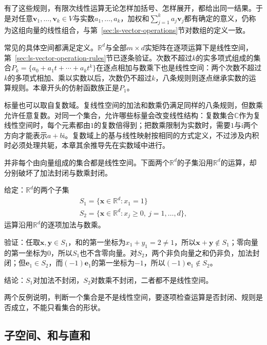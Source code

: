 有了这些规则，有限次线性运算无论怎样加括号、怎样展开，都给出同一结果。于是对任意$\bm v_1,\ldots,\bm v_k\in V$与实数$a_1,\ldots,a_k$，加权和$\sum_{j=1}^ka_j\bm v_j$都有确定的意义，仍称为这组向量的线性组合，与第~\ref{sec:ls-vector-operations}节对数组的定义一致。

常见的具体空间都满足定义。$\mathbb R^d$与全部$m\times d$实矩阵在逐项运算下是线性空间，第~\ref{sec:ls-vector-operation-rules}节已逐条验证。次数不超过$k$的实多项式组成的集合$P_k=\{a_0+a_1t+\cdots+a_kt^k\}$在逐点相加与数乘下也是线性空间：两个次数不超过$k$的多项式相加、乘以实数以后，次数仍不超过$k$，八条规则则逐点继承实数的运算规则。本章开头的仿射函数族正是$P_1$。

标量也可以取自复数域。复线性空间的加法和数乘仍满足同样的八条规则，但数乘允许任意复数。对同一个集合，允许哪些标量会改变线性结构：复数集合$\mathbb C$作为复线性空间时，每个元素都由$1$的复数倍得到；把数乘限制为实数时，需要$1$与$\mathrm i$两个方向才能表示$a+b\mathrm i$。复数域上的基与线性映射按相同的方式定义，不过涉及内积时必须处理共轭，本章其余推导先在实数域中进行。

并非每个由向量组成的集合都是线性空间。下面两个$\mathbb R^d$的子集沿用$\mathbb R^d$的运算，却分别破坏了加法封闭与数乘封闭。
\begin{example}[反例：仿射约束集与非负向量集]
\label{ex:ls-non-vector-space-sets}
给定：$\mathbb R^d$的两个子集
\[
 \begin{gathered}
S_1=\{\bm x\in\mathbb R^d:x_1=1\}\\
S_2=\{\bm x\in\mathbb R^d:x_j\geq0,\ j=1,\ldots,d\},
 \end{gathered}
\]
运算沿用$\mathbb R^d$的逐项加法与数乘。

验证：任取$\bm x,\bm y\in S_1$，和的第一坐标为$x_1+y_1=2\neq1$，所以$\bm x+\bm y\notin S_1$；零向量的第一坐标为$0$，所以$S_1$也不含零向量。对$S_2$，两个非负向量之和仍非负，加法封闭；但$\bm e_1\in S_2$，而$(-1)\bm e_1$的第一坐标为$-1$，所以$(-1)\bm e_1\notin S_2$。

结论：$S_1$对加法不封闭，$S_2$对数乘不封闭，二者都不是线性空间。
\end{example}
两个反例说明，判断一个集合是不是线性空间，要逐项检查运算是否封闭、规则是否成立，不能只看集合的形状。

\subsection{子空间、和与直和}
\label{sec:ls-subspaces}
\label{sec:linear-algebra-relations}
\label{sec:linear-algebra-subspace-relations}
\label{sec:ls-subspace-definition}

